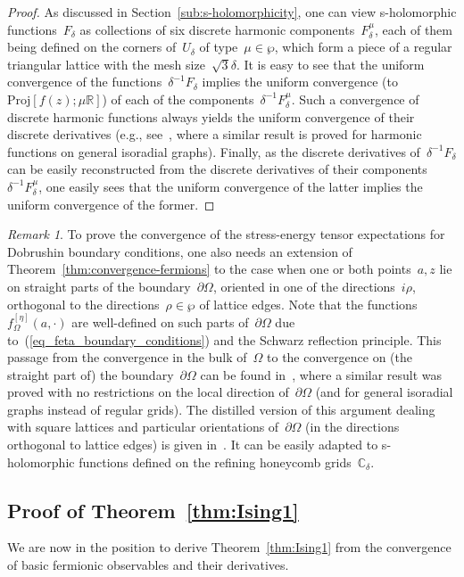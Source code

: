 \documentclass[reqno,11pt,a4paper]{amsart}
\theoremstyle{remark}
\newtheorem{remark}[proposition]{Remark}
\newcommand{\R}{\mathbb{R}}
\newcommand{\C}{\mathbb{C}}
\newcommand{\feta}{f_{\Omega}^{[\eta]}}
\def\LambdaU{U}
\begin{document}
\begin{proof} As discussed in {Section~\ref{sub:s-holomorphicity}}, one can view s-holomorphic functions~$F_\delta$ as collections of six discrete harmonic components~$F_\delta^\mu$, each of them being defined on the corners of~$\LambdaU_\delta$ of type~$\mu\in\wp$, which form a piece of a regular triangular lattice with the mesh size~$\sqrt{3}\delta$. It is easy to see that the uniform convergence of the functions~$\delta^{-1}F_\delta$ implies the uniform convergence (to~$\mathrm{Proj}[f(z);\mu\R]$) of each of the components~$\delta^{-1}F_\delta^\mu$. Such a convergence of discrete harmonic functions always yields the uniform convergence of their discrete derivatives (e.g., see~\cite[Proposition~3.3]{CheSmi11}, where a similar result is proved for harmonic functions on general isoradial graphs). Finally, as the discrete derivatives of~$\delta^{-1}F_\delta$ can be easily reconstructed from the discrete derivatives of their components~$\delta^{-1}F_\delta^\mu$, one easily sees that the uniform convergence of the latter implies the uniform convergence of the former.
\end{proof}

\begin{remark}
\label{rem:conv-on-boundary}
To prove the convergence of the stress-energy tensor expectations for Dobrushin boundary conditions, one also needs an extension of Theorem~\ref{thm:convergence-fermions} to the case when one or both points~$a,z$ lie on straight parts of the boundary~$\partial\Omega$, oriented in one of the directions~$ i\rho$, orthogonal to the directions~$\rho\in\wp$ of lattice edges. Note that the functions~$\feta(a,\cdot)$ are well-defined on such parts of~$\partial\Omega$ due to~(\ref{eq_feta_boundary_conditions}) and the Schwarz reflection principle. This passage from the convergence in the bulk of~$\Omega$ to the convergence on (the straight part of) the boundary~$\partial\Omega$ can be found in~\cite[Section~5.2]{CheSmi12}, where a similar result was proved with no restrictions on the local direction of~$\partial\Omega$ (and for general isoradial graphs instead of regular grids). The distilled version of this argument dealing with square lattices and particular orientations of~$\partial\Omega$ (in the directions orthogonal to lattice edges) is given in~\cite[Lemma~4.8]{CheIzy13}. It can be easily adapted to s-holomorphic functions defined on the refining honeycomb grids~$\C_\delta$.
\end{remark}

\subsection{Proof of Theorem~\ref{thm:Ising1}} \label{sub:convergence-theorem1}
We are now in the position to derive Theorem~\ref{thm:Ising1} from the convergence of basic fermionic observables and their derivatives.
\end{document}

